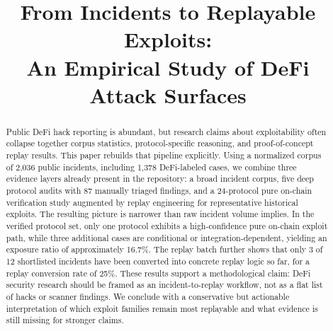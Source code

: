 \documentclass{article}
\title{From Incidents to Replayable Exploits:\\An Empirical Study of DeFi Attack Surfaces}
\author{}
\begin{document}
\maketitle
\fancyhead{}
\renewcommand{\headrulewidth}{0pt}
\pagestyle{fancy}
\thispagestyle{fancy}

\begin{abstract}
Public DeFi hack reporting is abundant, but research claims about exploitability often collapse together corpus statistics, protocol-specific reasoning, and proof-of-concept replay results. This paper rebuilds that pipeline explicitly. Using a normalized corpus of 2{,}036 public incidents, including 1{,}378 DeFi-labeled cases, we combine three evidence layers already present in the repository: a broad incident corpus, five deep protocol audits with 87 manually triaged findings, and a 24-protocol pure on-chain verification study augmented by replay engineering for representative historical exploits. The resulting picture is narrower than raw incident volume implies. In the verified protocol set, only one protocol exhibits a high-confidence pure on-chain exploit path, while three additional cases are conditional or integration-dependent, yielding an exposure ratio of approximately 16.7\%. The replay batch further shows that only 3 of 12 shortlisted incidents have been converted into concrete replay logic so far, for a replay conversion rate of 25\%. These results support a methodological claim: DeFi security research should be framed as an incident-to-replay workflow, not as a flat list of hacks or scanner findings. We conclude with a conservative but actionable interpretation of which exploit families remain most replayable and what evidence is still missing for stronger claims.
\end{abstract}













\end{document}
